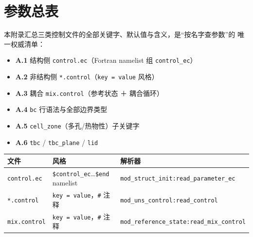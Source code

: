 
\section{参数总表}\label{app:params}

本附录汇总三类控制文件的全部关键字、默认值与含义，是``按名字查参数''的
唯一权威清单：

\begin{itemize}\itemsep2pt
  \item \textbf{A.1} 结构侧 \texttt{control.ec}（Fortran namelist 组 \texttt{control\_ec}）
  \item \textbf{A.2} 非结构侧 \texttt{*.control}（\texttt{key = value} 风格）
  \item \textbf{A.3} 耦合 \texttt{mix.control}（参考状态 ＋ 耦合循环）
  \item \textbf{A.4} \texttt{bc} 行语法与全部边界类型
  \item \textbf{A.5} \texttt{cell\_zone}（多孔/热物性）子关键字
  \item \textbf{A.6} \texttt{tbc} / \texttt{tbc\_plane} / \texttt{lid}
\end{itemize}

\begin{center}\small
\begin{tabular}{@{}>{\raggedright\arraybackslash}p{}>{\raggedright\arraybackslash}p{}>{\raggedright\arraybackslash}p{}@{}}
\toprule
文件 & 风格 & 解析器 \\
\midrule
\texttt{control.ec} & \texttt{\$control\_ec}\dots\texttt{\$end} namelist &
\texttt{mod\_struct\_init:read\_parameter\_ec} \\
\texttt{*.control} & \texttt{key = value}，\texttt{\#} 注释 &
\texttt{mod\_uns\_control:read\_control} \\
\texttt{mix.control} & \texttt{key = value}，\texttt{\#} 注释 &
\texttt{mod\_reference\_state:read\_mix\_control} \\
\bottomrule
\end{tabular}
\end{center}

